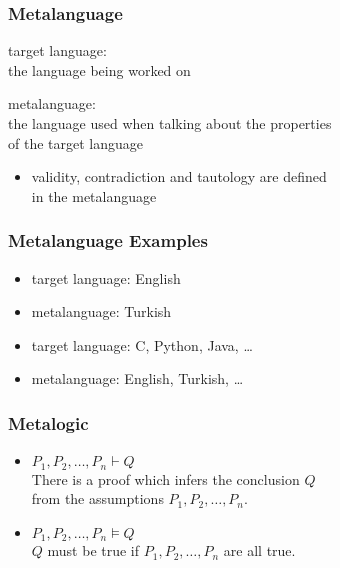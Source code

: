 \documentclass[dvipsnames]{beamer}
\begin{document}
\begin{frame}
  \frametitle{Metalanguage}

  \begin{definition}
    \alert{target language}:\\
      the language being worked on
  \end{definition}

  \pause
  \begin{definition}
    \alert{metalanguage}:\\
      the language used when talking about the properties\\
      of the target language
  \end{definition}

  \pause
  \begin{itemize}
    \item validity, contradiction and tautology are defined\\
      in the metalanguage
  \end{itemize}
\end{frame}

\begin{frame}
  \frametitle{Metalanguage Examples}

  \begin{example}
    \begin{itemize}
      \item target language: English
      \item metalanguage: Turkish
    \end{itemize}
  \end{example}

  \pause
  \begin{example}
    \begin{itemize}
      \item target language: C, Python, Java, \ldots
      \item metalanguage: English, Turkish, \ldots
    \end{itemize}
  \end{example}
\end{frame}

\begin{frame}
  \frametitle{Metalogic}

  \begin{itemize}
    \item $P_1,P_2,\dots,P_n \vdash Q$\\
      There is a proof which infers the conclusion $Q$\\
      from the assumptions $P_1,P_2,\dots,P_n$.

    \pause
    \medskip
    \item $P_1,P_2,\dots,P_n \vDash Q$\\
      $Q$ must be true if $P_1,P_2,\dots,P_n$ are all true.
  \end{itemize}
\end{frame}
\end{document}
